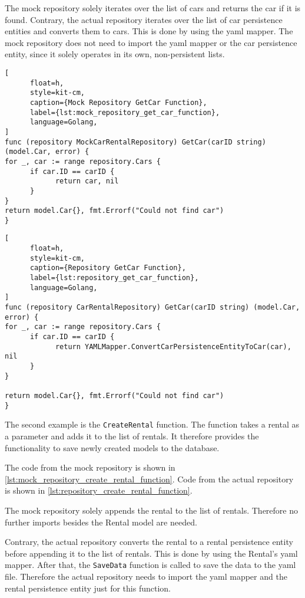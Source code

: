 The mock repository solely iterates over the list of cars and returns the car if it is found.
Contrary, the actual repository iterates over the list of car persistence entities and converts them to cars.
This is done by using the yaml mapper.
The mock repository does not need to import the yaml mapper or the car persistence entity, since it solely operates in its own, non-persistent lists.

\begin{lstlisting}[
      float=h,
      style=kit-cm,
      caption={Mock Repository GetCar Function},
      label={lst:mock_repository_get_car_function},
      language=Golang,
]
func (repository MockCarRentalRepository) GetCar(carID string) (model.Car, error) {
for _, car := range repository.Cars {
      if car.ID == carID {
            return car, nil
      }
}
return model.Car{}, fmt.Errorf("Could not find car")
}
\end{lstlisting}

\begin{lstlisting}[
      float=h,
      style=kit-cm,
      caption={Repository GetCar Function},
      label={lst:repository_get_car_function},
      language=Golang,
]
func (repository CarRentalRepository) GetCar(carID string) (model.Car, error) {
for _, car := range repository.Cars {
      if car.ID == carID {
            return YAMLMapper.ConvertCarPersistenceEntityToCar(car), nil
      }
}

return model.Car{}, fmt.Errorf("Could not find car")
}
\end{lstlisting}

The second example is the \texttt{CreateRental} function.
The function takes a rental as a parameter and adds it to the list of rentals.
It therefore provides the functionality to save newly created models to the database.

The code from the mock repository is shown in \autoref{lst:mock_repository_create_rental_function}.
Code from the actual repository is shown in \autoref{lst:repository_create_rental_function}.

The mock repository solely appends the rental to the list of rentals.
Therefore no further imports besides the Rental model are needed.

Contrary, the actual repository converts the rental to a rental persistence entity before appending it to the list of rentals.
This is done by using the Rental's yaml mapper.
After that, the \texttt{SaveData} function is called to save the data to the yaml file.
Therefore the actual repository needs to import the yaml mapper and the rental persistence entity just for this function.

